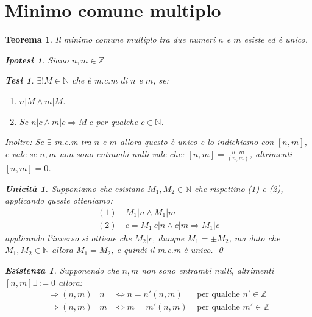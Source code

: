 \documentclass{article}
\makeatletter
\renewenvironment{proof}[1][\proofname]{\par
    \pushQED{\qed}%
    \normalfont \topsep6\p@\@plus6\p@\relax
    \trivlist
    \item\relax
    {\itshape
    #1\@addpunct{.}}\hspace\labelsep\ignorespaces
    }{%
    \popQED\endtrivlist\@endpefalse
}
\newtheorem{theorem}{Teorema}[part]
\newtheorem{ipothesis}[lemma]{Ipotesi}
\newtheorem{thesis}[lemma]{Tesi}
\theoremstyle{definition}
\newtheorem*{existence}{Esistenza}
\newtheorem*{uniqueness}{Unicità}
\makeatother
\begin{document}
\section{Minimo comune multiplo}
\begin{theorem}
    Il minimo comune multiplo tra due numeri \(n\) e \(m\) esiste ed è unico.
    \begin{ipothesis}
        Siano \(n,m\in\mathbb{Z}\)
    \end{ipothesis}
    \begin{thesis}
        \(\exists!M\in\mathbb{N}\) che è m.c.m di \(n\) e \(m\), se:
        \begin{enumerate}
            \item \(n|M\land m|M\).
            \item Se \(n|c \land m|c \Rightarrow M|c\) per qualche \(c\in\mathbb{N}\). 
        \end{enumerate}
        Inoltre: Se \(\exists\) m.c.m tra \(n\) e \(m\) allora questo è unico e lo indichiamo con \([n,m]\), e vale se \(n,m\) non sono entrambi nulli vale che: \([n,m]=\frac{n\cdot m}{(n,m)}\), altrimenti \([n,m]=0\).
    \end{thesis}
    \begin{proof}
        \begin{uniqueness}
            Supponiamo che esistano \(M_1,M_2\in\mathbb{N}\) che rispettino (1) e (2), applicando queste otteniamo:
            \[
                \begin{aligned}
                    (1)&\ M_1|n \land M_1|m\\
                    (2)&\ c=M_1\ c|n \land c|m \Rightarrow M_1|c
                \end{aligned}
            \]
            applicando l'inverso si ottiene che \(M_2|c\), dunque \(M_1=\pm M_2\), ma dato che \(M_1,M_2\in\mathbb{N}\) allora \(M_1=M_2\), e quindi il m.c.m è unico.
            \qed
        \end{uniqueness}
        \begin{existence}
            Supponendo che \(n,m\) non sono entrambi nulli, altrimenti \([n,m]\exists :=0\) allora:
            \[
                \begin{aligned}
                    \Rightarrow (n,m)\mid n&\Leftrightarrow n=n'(n,m)&\text{ per qualche } n' \in\mathbb{Z}\\
                    \Rightarrow (n,m)\mid m&\Leftrightarrow m=m'(n,m)&\text{ per qualche } m' \in\mathbb{Z}
                \end{aligned}
\]
\end{existence}
\end{proof}
\end{theorem}
\end{document}
